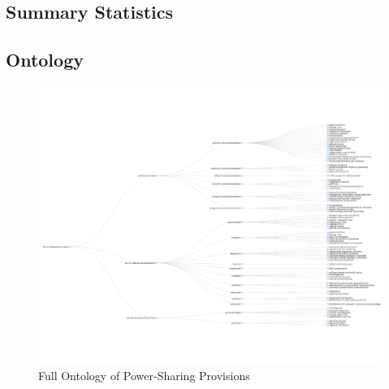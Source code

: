\documentclass[12pt]{article}
\begin{document}
\subsection{Summary Statistics}

\subsection{Ontology}
\begin{figure}
	\includegraphics[width = 9.5in]{psp_ontology_vis.png}
	\caption{Full Ontology of Power-Sharing Provisions}
\end{figure}
\end{document}
